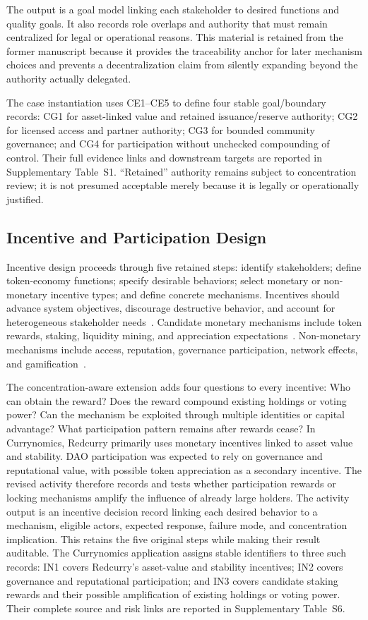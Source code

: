 \documentclass[referee,sn-basic]{sn-jnl}
\begin{document}
The output is a goal model linking each stakeholder to desired functions and
quality goals. It also records role overlaps and authority that must remain
centralized for legal or operational reasons. This material is retained from
the former manuscript because it provides the traceability anchor for later
mechanism choices and prevents a decentralization claim from silently expanding
beyond the authority actually delegated.

The case instantiation uses CE1--CE5 to define four stable goal/boundary records:
CG1 for asset-linked value and retained issuance/reserve authority; CG2 for
licensed access and partner authority; CG3 for bounded community governance;
and CG4 for participation without unchecked compounding of control. Their full
evidence links and downstream targets are reported in Supplementary
Table~S1. ``Retained'' authority remains subject to concentration review; it is
not presumed acceptable merely because it is legally or operationally justified.

\subsection{Incentive and Participation Design}\label{subsec:incentives}

Incentive design proceeds through five retained steps: identify stakeholders;
define token-economy functions; specify desirable behaviors; select monetary or
non-monetary incentive types; and define concrete mechanisms. Incentives should
advance system objectives, discourage destructive behavior, and account for
heterogeneous stakeholder needs~\cite{Khamisa2021,Yoo2021}. Candidate monetary
mechanisms include token rewards, staking, liquidity mining, and appreciation
expectations~\cite{Liu2022TokenIncentives}. Non-monetary mechanisms include
access, reputation, governance participation, network effects, and
gamification~\cite{Freni2022,Kim2018,liu2022}.

The concentration-aware extension adds four questions to every incentive:
Who can obtain the reward? Does the reward compound existing holdings or voting
power? Can the mechanism be exploited through multiple identities or capital
advantage? What participation pattern remains after rewards cease? In
Currynomics, Redcurry primarily uses monetary incentives linked to asset value
and stability. DAO participation was expected to rely on governance and
reputational value, with possible token appreciation as a secondary incentive.
The revised activity therefore records and tests whether participation rewards
or locking mechanisms amplify the influence of already large holders.
The activity output is an incentive decision record linking each desired
behavior to a mechanism, eligible actors, expected response, failure mode, and
concentration implication. This retains the five original steps while making
their result auditable. The Currynomics application assigns stable identifiers
to three such records: IN1 covers Redcurry's asset-value and stability
incentives; IN2 covers governance and reputational participation; and IN3
covers candidate staking rewards and their possible amplification of existing
holdings or voting power. Their complete source and risk links are reported in
Supplementary Table~S6.
\end{document}
